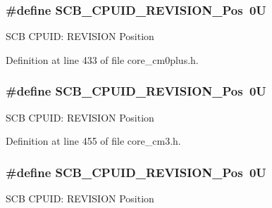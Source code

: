 \subsubsection[{\texorpdfstring{S\+C\+B\+\_\+\+C\+P\+U\+I\+D\+\_\+\+R\+E\+V\+I\+S\+I\+O\+N\+\_\+\+Pos}{SCB_CPUID_REVISION_Pos}}]{\setlength{\rightskip}{0pt plus 5cm}\#define S\+C\+B\+\_\+\+C\+P\+U\+I\+D\+\_\+\+R\+E\+V\+I\+S\+I\+O\+N\+\_\+\+Pos~0U}\hypertarget{group___c_m_s_i_s___s_c_b_ga3c3d9071e574de11fb27ba57034838b1}{}\label{group___c_m_s_i_s___s_c_b_ga3c3d9071e574de11fb27ba57034838b1}
S\+CB C\+P\+U\+ID\+: R\+E\+V\+I\+S\+I\+ON Position 

Definition at line 433 of file core\+\_\+cm0plus.\+h.

\subsubsection[{\texorpdfstring{S\+C\+B\+\_\+\+C\+P\+U\+I\+D\+\_\+\+R\+E\+V\+I\+S\+I\+O\+N\+\_\+\+Pos}{SCB_CPUID_REVISION_Pos}}]{\setlength{\rightskip}{0pt plus 5cm}\#define S\+C\+B\+\_\+\+C\+P\+U\+I\+D\+\_\+\+R\+E\+V\+I\+S\+I\+O\+N\+\_\+\+Pos~0U}\hypertarget{group___c_m_s_i_s___s_c_b_ga3c3d9071e574de11fb27ba57034838b1}{}\label{group___c_m_s_i_s___s_c_b_ga3c3d9071e574de11fb27ba57034838b1}
S\+CB C\+P\+U\+ID\+: R\+E\+V\+I\+S\+I\+ON Position 

Definition at line 455 of file core\+\_\+cm3.\+h.

\subsubsection[{\texorpdfstring{S\+C\+B\+\_\+\+C\+P\+U\+I\+D\+\_\+\+R\+E\+V\+I\+S\+I\+O\+N\+\_\+\+Pos}{SCB_CPUID_REVISION_Pos}}]{\setlength{\rightskip}{0pt plus 5cm}\#define S\+C\+B\+\_\+\+C\+P\+U\+I\+D\+\_\+\+R\+E\+V\+I\+S\+I\+O\+N\+\_\+\+Pos~0U}\hypertarget{group___c_m_s_i_s___s_c_b_ga3c3d9071e574de11fb27ba57034838b1}{}\label{group___c_m_s_i_s___s_c_b_ga3c3d9071e574de11fb27ba57034838b1}
S\+CB C\+P\+U\+ID\+: R\+E\+V\+I\+S\+I\+ON Position 

